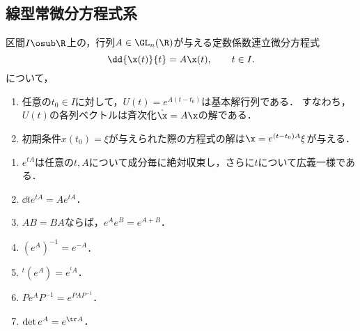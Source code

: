 \documentclass[uplatex,dvipdfmx]{jsarticle}
\begin{document}
\subsection{線型常微分方程式系}

\begin{theorem}
    区間$I\osub\R$上の，行列$A\in\GL_n(\R)$が与える定数係数連立微分方程式
    \[\dd{\x(t)}{t}=A\x(t),\qquad t\in I.\]
    について，
    \begin{enumerate}
        \item 任意の$t_0\in I$に対して，$U(t)=e^{A(t-t_0)}$は基本解行列である．
        すなわち，$U(t)$の各列ベクトルは斉次化$\dot{\x}=A\x$の解である．
        \item 初期条件$x(t_0)=\xi$が与えられた際の方程式の解は$\x=e^{(t-t_0)A}\xi$が与える．
    \end{enumerate}
\end{theorem}

\begin{lemma}[行列の指数関数の性質]\mbox{}
    \begin{enumerate}
        \item $e^{tA}$は任意の$t,A$について成分毎に絶対収束し，さらに$t$について広義一様である．
        \item $\dd{}{t}e^{tA}=Ae^{tA}$．
        \item $AB=BA$ならば，$e^{A}e^B=e^{A+B}$．
        \item $(e^A)^{-1}=e^{-A}$．
        \item ${}^t\!(e^A)=e^{{}^t\!A}$．
        \item $Pe^{A}P^{-1}=e^{PAP^{-1}}$．
        \item $\det e^{A}=e^{\tr A}$．
    \end{enumerate}
\end{lemma}
\end{document}
